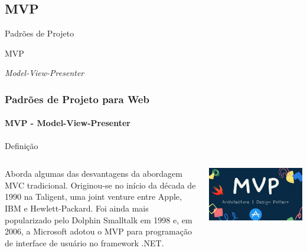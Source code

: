 \documentclass[
	9pt, %
	t, %
]{beamer}
\begin{document}


\subsection{MVP}

\begin{frame}
	\begin{center}
		
		\bigskip\bigskip\bigskip\bigskip %
		{\Large Padrões de Projeto}
		
		\bigskip\bigskip %
		{\Huge MVP}
		
		\smallskip
		{\small \textit{Model-View-Presenter}}
	\end{center}

\end{frame}

\begin{frame}
	\frametitle{Padrões de Projeto para Web}
	\framesubtitle{MVP - Model-View-Presenter}

	\begin{block}{Definição}
	\begin{columns}[c] %
			\begin{column}{0.8\textwidth} %
				Aborda algumas das desvantagens da abordagem MVC tradicional. Originou-se no início da década de 1990 na Taligent, uma joint venture entre Apple, IBM e Hewlett-Packard. Foi ainda mais popularizado pelo Dolphin Smalltalk em 1998 e, em 2006, a Microsoft adotou o MVP para programação de interface de usuário no framework .NET.
			\end{column}

			\begin{column}{0.2\textwidth} %
				\includegraphics[width=0.9\linewidth]{Images/mvp_logo.jpg}
			\end{column}
		\end{columns}
	\end{block}

\end{frame}
\end{document}
